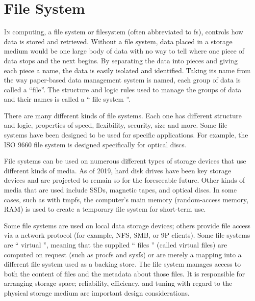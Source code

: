 \subsectionend

\sectionend

\section{{File System}}
\label{sec:file_system}


\lettrine[lines=3, findent=3pt, nindent=0pt]{I}{n} computing, a file system or
filesystem (often abbreviated to fs), controls how data is stored and retrieved.
Without a file system, data placed in a storage medium would be one large body
of data with no way to tell where one piece of data stops and the next begins.
By separating the data into pieces and giving each piece a name, the data is
easily isolated and identified. Taking its name from the way paper-based data
management system is named, each group of data is called a ``{file}''. The
structure and logic rules used to manage the groups of data and their names is
called a `` file system ''.



There are many different kinds of file systems. Each one has different structure
and logic, properties of speed, flexibility, security, size and more. Some file
systems have been designed to be used for specific applications. For example,
the ISO 9660 file system is designed specifically for optical discs.



File systems can be used on numerous different types of storage devices that use
different kinds of media. As of 2019, hard disk drives have been key storage
devices and are projected to remain so for the foreseeable future. Other
kinds of media that are used include SSDs, magnetic tapes, and optical discs. In
some cases, such as with tmpfs, the computer's main memory (random-access
memory, RAM) is used to create a temporary file system for short-term use.



Some file systems are used on local data storage devices; others provide file
access via a network protocol (for example, NFS, SMB, or 9P clients). Some
file systems are `` virtual '', meaning that the supplied `` files '' (called
virtual files) are computed on request (such as procfs and sysfs) or are merely
a mapping into a different file system used as a backing store. The file system
manages access to both the content of files and the metadata about those files.
It is responsible for arranging storage space; reliability, efficiency, and
tuning with regard to the physical storage medium are important design
considerations. 





